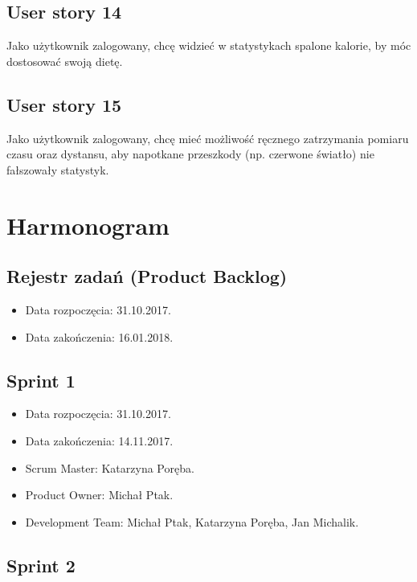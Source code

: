 \documentclass[a4paper]{article}
\begin{document}
\subsection{User story 14}
Jako użytkownik zalogowany, chcę widzieć w statystykach spalone kalorie, by móc dostosować swoją dietę.

\subsection{User story 15}
Jako użytkownik zalogowany, chcę mieć możliwość ręcznego zatrzymania pomiaru czasu oraz dystansu, aby napotkane przeszkody (np. czerwone światło) nie fałszowały statystyk.


\section{Harmonogram}

\subsection{Rejestr zadań (Product Backlog)}

\begin{itemize}
\item Data rozpoczęcia: 31.10.2017.
\item  Data zakończenia: 16.01.2018.
\end{itemize}

\subsection{Sprint 1}

\begin{itemize}
\item Data rozpoczęcia: 31.10.2017.
\item Data zakończenia: 14.11.2017.
\item Scrum Master: Katarzyna Poręba.
\item Product Owner: Michał Ptak.
\item Development Team: Michał Ptak, Katarzyna Poręba, Jan Michalik.
\end{itemize}

\subsection{Sprint 2}
\end{document}
